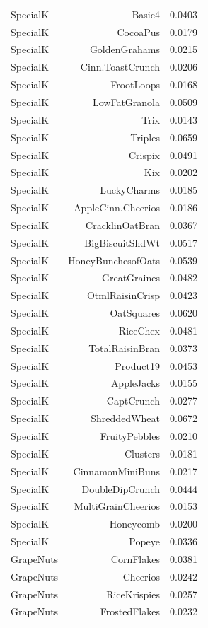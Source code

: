 \begin{longtable}{@{}lrr@{}}
SpecialK & Basic4 & 0.0403 \\
SpecialK & CocoaPus & 0.0179 \\
SpecialK & GoldenGrahams & 0.0215 \\
SpecialK & Cinn.ToastCrunch & 0.0206 \\
SpecialK & FrootLoops & 0.0168 \\
SpecialK & LowFatGranola & 0.0509 \\
SpecialK & Trix & 0.0143 \\
SpecialK & Triples & 0.0659 \\
SpecialK & Crispix & 0.0491 \\
SpecialK & Kix & 0.0202 \\
SpecialK & LuckyCharms & 0.0185 \\
SpecialK & AppleCinn.Cheerios & 0.0186 \\
SpecialK & CracklinOatBran & 0.0367 \\
SpecialK & BigBiscuitShdWt & 0.0517 \\
SpecialK & HoneyBunchesofOats & 0.0539 \\
SpecialK & GreatGraines & 0.0482 \\
SpecialK & OtmlRaisinCrisp & 0.0423 \\
SpecialK & OatSquares & 0.0620 \\
SpecialK & RiceChex & 0.0481 \\
SpecialK & TotalRaisinBran & 0.0373 \\
SpecialK & Product19 & 0.0453 \\
SpecialK & AppleJacks & 0.0155 \\
SpecialK & CaptCrunch & 0.0277 \\
SpecialK & ShreddedWheat & 0.0672 \\
SpecialK & FruityPebbles & 0.0210 \\
SpecialK & Clusters & 0.0181 \\
SpecialK & CinnamonMiniBuns & 0.0217 \\
SpecialK & DoubleDipCrunch & 0.0444 \\
SpecialK & MultiGrainCheerios & 0.0153 \\
SpecialK & Honeycomb & 0.0200 \\
SpecialK & Popeye & 0.0336 \\
GrapeNuts & CornFlakes & 0.0381 \\
GrapeNuts & Cheerios & 0.0242 \\
GrapeNuts & RiceKrispies & 0.0257 \\
GrapeNuts & FrostedFlakes & 0.0232 \\

\end{longtable}
